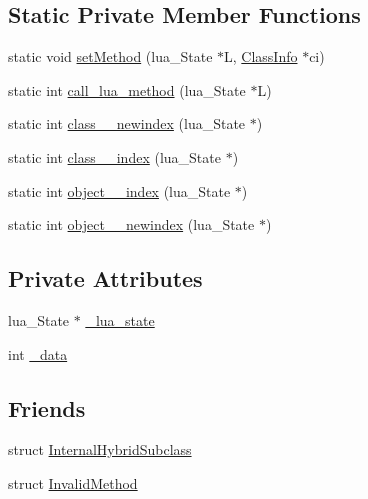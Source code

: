 \subsection*{Static Private Member Functions}
\begin{DoxyCompactItemize}
\item 
static void \hyperlink{classSLB_1_1HybridBase_a10fedce6ebbda8be79099a09a771437f}{set\+Method} (lua\+\_\+\+State $\ast$L, \hyperlink{classSLB_1_1ClassInfo}{Class\+Info} $\ast$ci)
\item 
static int \hyperlink{classSLB_1_1HybridBase_af3933c24aa75e74eaef71a6f4b63a859}{call\+\_\+lua\+\_\+method} (lua\+\_\+\+State $\ast$L)
\item 
static int \hyperlink{classSLB_1_1HybridBase_ae30481d79fbbaccba0ff11b0fdd0f1a0}{class\+\_\+\+\_\+newindex} (lua\+\_\+\+State $\ast$)
\item 
static int \hyperlink{classSLB_1_1HybridBase_a32893051c2d332f7a7a7eb43f94226e2}{class\+\_\+\+\_\+index} (lua\+\_\+\+State $\ast$)
\item 
static int \hyperlink{classSLB_1_1HybridBase_af52187418360673588858c61c1b997dc}{object\+\_\+\+\_\+index} (lua\+\_\+\+State $\ast$)
\item 
static int \hyperlink{classSLB_1_1HybridBase_af8569d54aef3c92d54063f0fea928a60}{object\+\_\+\+\_\+newindex} (lua\+\_\+\+State $\ast$)
\end{DoxyCompactItemize}
\subsection*{Private Attributes}
\begin{DoxyCompactItemize}
\item 
lua\+\_\+\+State $\ast$ \hyperlink{classSLB_1_1HybridBase_a86452ea4289e8da0396c5c6f64802992}{\+\_\+lua\+\_\+state}
\item 
int \hyperlink{classSLB_1_1HybridBase_aa7f3e7eaffd58ae3e0ef28d63d5904e2}{\+\_\+data}
\end{DoxyCompactItemize}
\subsection*{Friends}
\begin{DoxyCompactItemize}
\item 
struct \hyperlink{classSLB_1_1HybridBase_ace3fe1e57cde7a60668d3ded677e2139}{Internal\+Hybrid\+Subclass}
\item 
struct \hyperlink{classSLB_1_1HybridBase_a5581d5e6b6740a0b5fd5e4ab5a5980c0}{Invalid\+Method}
\end{DoxyCompactItemize}


